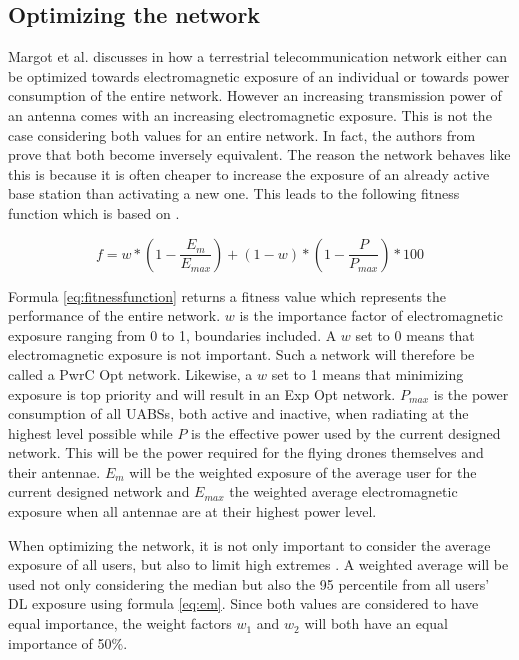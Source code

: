 \documentclass[twocolumn]{phdsymp} %
\begin{document}
\subsection{Optimizing the network}

Margot et al. discusses in \cite{J1} how a terrestrial  telecommunication network either can be optimized towards electromagnetic 
exposure of an individual or towards power consumption of the entire network. 
However an increasing transmission power of an antenna comes with an increasing electromagnetic exposure. This is not the case considering
both values for an entire network. In fact, the authors from \cite{J1}  prove that both become inversely equivalent.
The reason the network behaves like this is because it is often cheaper to increase the exposure of an already active base station 
than activating a new one. 
This leads to the following fitness function which is based on \cite{J1}.

\begin{equation} 
f = w * \left(1 - \frac{E_m}{E_{max}}\right) + (1 - w)*\left(1 - \frac{P}{P_{max}}\right) * 100
\label{eq:fitnessfunction}
\end{equation}

Formula \ref{eq:fitnessfunction} returns a fitness value which represents the performance of the entire network. 
$w$ is the importance factor of electromagnetic exposure ranging from 0 to 1, boundaries included. A $w$ set to 0 means that electromagnetic 
exposure is not important. Such a network will therefore be called a \gls{PwrC Opt} network. 
Likewise, a $w$ set to 1 means that minimizing exposure is top priority and will result in an \gls{Exp Opt} network. $P_{max}$ is the power consumption of all UABSs, 
both active and inactive, when radiating at the highest level possible 
while $P$ is the effective power used by the current designed network. 
This will be the power required for the flying drones themselves and their antennae.
$E_m$ will be the weighted exposure of the average user for the current designed network and $E_{max}$ the weighted average electromagnetic exposure when all antennae 
are at their highest power level.

When optimizing the network, it is not only important to consider the average exposure of all users, but also to limit high extremes \cite{J1}. A weighted average 
will be used not only considering the median but also the 95 percentile from all users' \gls{DL} exposure using formula \ref{eq:em}. 
Since both values are considered to have equal importance, the weight factors $w_1$ and $w_2$ will both have an equal importance of 50\%. 
\end{document}
